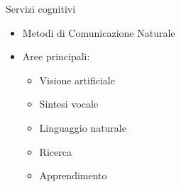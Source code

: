%
\begin{frame}[t]{Servizi cognitivi}
\begin{itemize}
	\item Metodi di Comunicazione Naturale
	\item Aree principali:
	\begin{itemize}
		\item Visione artificiale
		\item Sintesi vocale
		\item Linguaggio naturale
		\item Ricerca
		\item Apprendimento
	\end{itemize}
\end{itemize}
\end{frame}
%
